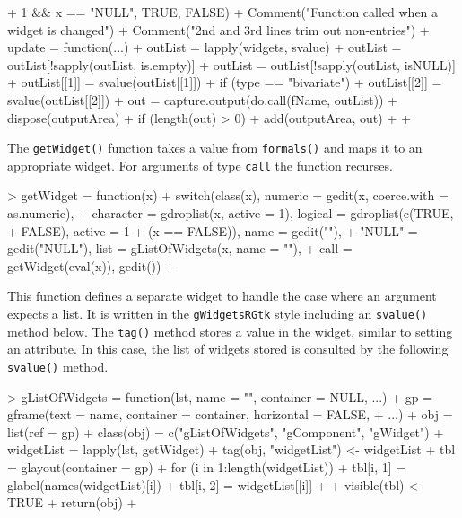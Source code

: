 \documentclass[12pt]{article}
\newcommand{\RCode}[1]{\texttt{#1}}
\newcommand{\RFunc}[1]{\texttt{#1()}}
\begin{document}
\begin{Schunk}
\begin{Sinput}
{+         1 && x == "NULL", TRUE, FALSE)
+     Comment("Function called when a widget is changed")
+     Comment("2nd and 3rd lines trim out non-entries")
+     update = function(...) {
+         outList = lapply(widgets, svalue)
+         outList = outList[!sapply(outList, is.empty)]
+         outList = outList[!sapply(outList, isNULL)]
+         outList[[1]] = svalue(outList[[1]])
+         if (type == "bivariate") 
+             outList[[2]] = svalue(outList[[2]])
+         out = capture.output(do.call(fName, outList))
+         dispose(outputArea)
+         if (length(out) > 0) 
+             add(outputArea, out)
+     }
+ }
\end{Sinput}
\end{Schunk}

The \RFunc{getWidget} function takes a value from \RFunc{formals}
and maps it to an appropriate widget. For arguments of type
\RCode{call} the function recurses.

\begin{Schunk}
\begin{Sinput}
> getWidget = function(x) {
+     switch(class(x), numeric = gedit(x, coerce.with = as.numeric), 
+         character = gdroplist(x, active = 1), logical = gdroplist(c(TRUE, 
+             FALSE), active = 1 + (x == FALSE)), name = gedit(""), 
+         "NULL" = gedit("NULL"), list = gListOfWidgets(x, name = ""), 
+         call = getWidget(eval(x)), gedit())
+ }
\end{Sinput}
\end{Schunk}

This function defines a separate widget to handle the case where an
argument expects a list. It is written in the \RCode{gWidgetsRGtk} style
including an \RFunc{svalue} method below. The \RFunc{tag} method stores
a value in the widget, similar to setting an attribute. In this case,
the list of widgets stored is consulted by the following \RFunc{svalue} method.

\begin{Schunk}
\begin{Sinput}
> gListOfWidgets = function(lst, name = "", container = NULL, ...) {
+     gp = gframe(text = name, container = container, horizontal = FALSE, 
+         ...)
+     obj = list(ref = gp)
+     class(obj) = c("gListOfWidgets", "gComponent", "gWidget")
+     widgetList = lapply(lst, getWidget)
+     tag(obj, "widgetList") <- widgetList
+     tbl = glayout(container = gp)
+     for (i in 1:length(widgetList)) {
+         tbl[i, 1] = glabel(names(widgetList)[i])
+         tbl[i, 2] = widgetList[[i]]
+     }
+     visible(tbl) <- TRUE
+     return(obj)
+ }
\end{Sinput}
\end{Schunk}
\end{document}
